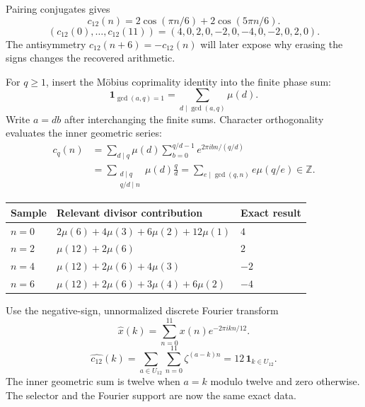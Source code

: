 Pairing conjugates gives
\[
 c_{12}(n)=2\cos(\pi n/6)+2\cos(5\pi n/6).
\]
\[
 (c_{12}(0),\ldots,c_{12}(11))=(4,0,2,0,-2,0,-4,0,-2,0,2,0).
\]
The antisymmetry $c_{12}(n+6)=-c_{12}(n)$ will later expose why erasing the signs changes the recovered arithmetic.

For $q\geq1$, insert the M\"obius coprimality identity into the finite phase sum:
\[
 \mathbf1_{\gcd(a,q)=1}=\sum_{d\mid\gcd(a,q)}\mu(d).
\]
Write $a=db$ after interchanging the finite sums. Character orthogonality evaluates the inner geometric series:
\[
 \begin{aligned}
 c_q(n)&=\sum_{d\mid q}\mu(d)\sum_{b=0}^{q/d-1}e^{2\pi ibn/(q/d)}\\
 &=\sum_{\substack{d\mid q\\q/d\mid n}}\mu(d)\frac qd
 =\sum_{e\mid\gcd(q,n)}e\mu(q/e)\in\mathbb Z.
 \end{aligned}
\]
\begin{center}
\begin{tabular}{lll}\toprule
Sample & Relevant divisor contribution & Exact result\\\midrule
$n=0$ & $2\mu(6)+4\mu(3)+6\mu(2)+12\mu(1)$ & $4$\\
$n=2$ & $\mu(12)+2\mu(6)$ & $2$\\
$n=4$ & $\mu(12)+2\mu(6)+4\mu(3)$ & $-2$\\
$n=6$ & $\mu(12)+2\mu(6)+3\mu(4)+6\mu(2)$ & $-4$\\\bottomrule
\end{tabular}
\end{center}

Use the negative-sign, unnormalized discrete Fourier transform
\[
 \widehat x(k)=\sum_{n=0}^{11}x(n)e^{-2\pi ikn/12}.
\]
\[
 \widehat{c_{12}}(k)=\sum_{a\in U_{12}}\sum_{n=0}^{11}\zeta^{(a-k)n}
 =12\,\mathbf1_{k\in U_{12}}.
\]
The inner geometric sum is twelve when $a=k$ modulo twelve and zero otherwise. The selector and the Fourier support are now the same exact data.

